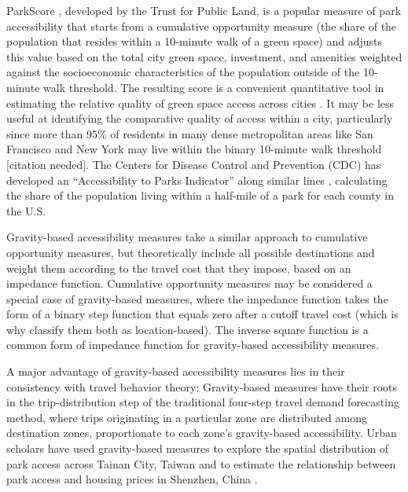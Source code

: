 \documentclass[]{elsarticle} %
\begin{document}
ParkScore \citep{parkscore2019}, developed by the Trust for Public Land, is a popular
measure of park accessibility that starts from a cumulative opportunity measure
(the share of the population that resides within a 10-minute walk of a green
space) and adjusts this value based on the total city green space, investment,
and amenities weighted against the socioeconomic characteristics of the
population outside of the 10-minute walk threshold. The resulting score is a
convenient quantitative tool in estimating the relative quality of green space
access across cities \citep{Rigolon2018}. It may be less useful at identifying the
comparative quality of access within a city, particularly since more than 95\% of
residents in many dense metropolitan areas like San Francisco and New York may
live within the binary 10-minute walk threshold {[}citation needed{]}. The Centers
for Disease Control and Prevention (CDC) has developed an ``Accessibility to
Parks Indicator'' along similar lines \citep{Ussery2016}, calculating the share of the
population living within a half-mile of a park for each county in the U.S.

Gravity-based accessibility measures take a similar approach to cumulative
opportunity measures, but theoretically include all possible destinations and
weight them according to the travel cost that they impose, based on an impedance
function. Cumulative opportunity measures may be considered a special case of
gravity-based measures, where the impedance function takes the form of a binary
step function that equals zero after a cutoff travel cost (which is why
\citet{GEURS2004127} classify them both as location-based). The inverse square function
is a common form of impedance function for gravity-based accessibility measures.

A major advantage of gravity-based accessibility measures lies in their
consistency with travel behavior theory: Gravity-based measures have their roots
in the trip-distribution step of the traditional four-step travel demand
forecasting method, where trips originating in a particular zone are distributed
among destination zones, proportionate to each zone's gravity-based
accessibility. Urban scholars have used gravity-based measures to explore the
spatial distribution of park access across Tainan City, Taiwan
\citep{chang2011exploring} and to estimate the relationship between park access and
housing prices in Shenzhen, China \citep{wu2017spatial}.
\end{document}
